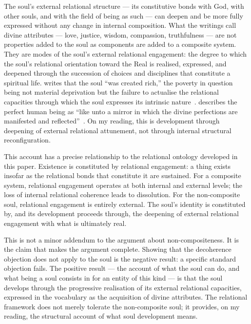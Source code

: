 The soul's external relational structure --- its constitutive bonds with God,
with other souls, and with the field of being as such --- can deepen and be
more fully expressed without any change in internal composition.
What the writings call divine attributes --- love, justice, wisdom,
compassion, truthfulness --- are not properties added to the soul as components
are added to a composite system.
They are modes of the soul's external relational engagement: the degree to which
the soul's relational orientation toward the Real is realised, expressed,
and deepened through the succession of choices and disciplines that constitute
a spiritual life.
\Bahaullah writes that the soul ``was created rich,'' the poverty in question
being not material deprivation but the failure to actualise the relational
capacities through which the soul expresses its intrinsic
nature~\citep{HiddenWords}.
\AbdulBaha describes the perfect human being as ``like unto a mirror in which
the divine perfections are manifested and reflected''~\citep{SelectionsAbdul}.
On my reading, this is development through deepening of external relational
attunement, not through internal structural reconfiguration.

This account has a precise relationship to the relational ontology developed
in this paper.
Existence is constituted by relational engagement: a thing exists insofar as
the relational bonds that constitute it are sustained.
For a composite system, relational engagement operates at both internal and
external levels; the loss of internal relational coherence leads to dissolution.
For the non-composite soul, relational engagement is entirely external.
The soul's identity is constituted by, and its development proceeds through,
the deepening of external relational engagement with what is ultimately real.

This is not a minor addendum to the argument about non-compositeness.
It is the claim that makes the argument complete.
Showing that the decoherence objection does not apply to the soul is the
negative result: a specific standard objection fails.
The positive result --- the account of what the soul can do, and what
being a soul consists in for an entity of this kind --- is that the soul
develops through the progressive realisation of its external relational
capacities, expressed in the \bahai vocabulary as the acquisition of divine
attributes.
The relational framework does not merely tolerate the non-composite soul;
it provides, on my reading, the structural account of what soul development means.

